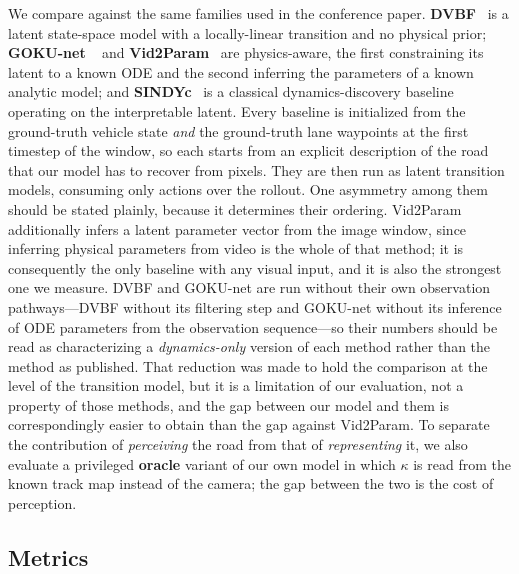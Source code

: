 \documentclass[preprint,12pt]{elsarticle}
\begin{document}
We compare against the same families used in the conference paper.
\textbf{DVBF}~\cite{karl2016deep} is a latent state-space model with a
locally-linear transition and no physical prior; \textbf{GOKU-net}
~\cite{linial_generative_2021} and \textbf{Vid2Param}~\cite{asenov2019vid2param}
are physics-aware, the first constraining its latent to a known ODE and the second
inferring the parameters of a known analytic model; and
\textbf{SINDYc}~\cite{BRUNTON2016710} is a classical dynamics-discovery baseline
operating on the interpretable latent.
Every baseline is initialized from the ground-truth vehicle state \emph{and} the
ground-truth lane waypoints at the first timestep of the window, so each starts
from an explicit description of the road that our model has to recover from
pixels.
They are then run as latent transition models, consuming only actions over the
rollout.
One asymmetry among them should be stated plainly, because it determines their
ordering.
Vid2Param additionally infers a latent parameter vector from the image window,
since inferring physical parameters from video is the whole of that method; it is
consequently the only baseline with any visual input, and it is also the strongest
one we measure.
DVBF and GOKU-net are run without their own observation pathways---DVBF without
its filtering step and GOKU-net without its inference of ODE parameters from the
observation sequence---so their numbers should be read as characterizing a
\emph{dynamics-only} version of each method rather than the method as published.
That reduction was made to hold the comparison at the level of the transition
model, but it is a limitation of our evaluation, not a property of those methods,
and the gap between our model and them is correspondingly easier to obtain than
the gap against Vid2Param.
To separate the contribution of \emph{perceiving} the road from that of
\emph{representing} it, we also evaluate a privileged \textbf{oracle} variant of
our own model in which $\kappa$ is read from the known track map instead of the
camera; the gap between the two is the cost of perception.

\subsection{Metrics}
\end{document}
